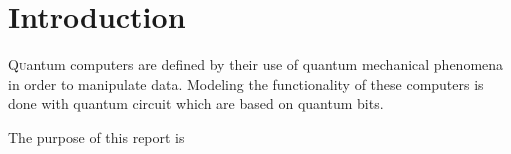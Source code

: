 \section{Introduction}

\lettrine[nindent=0em,lines=3]{Q}uantum computers are defined by their use of quantum mechanical phenomena in order to manipulate data. Modeling the functionality of these computers is done with quantum circuit which are based on quantum bits.

The purpose of this report is

